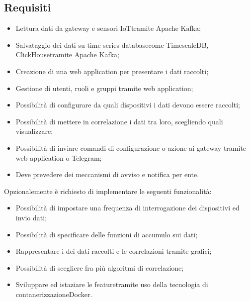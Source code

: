 \subsection{Requisiti}
\begin{itemize}
	\item Lettura dati da gateway e sensori IoT\glosp tramite Apache Kafka\glo;
	\item Salvataggio dei dati su time series database\glosp come TimescaleDB\glo, ClickHouse\glosp tramite Apache Kafka\glo;
	\item Creazione di una web application per presentare i dati raccolti;
	\item Gestione di utenti, ruoli e gruppi tramite web application;
	\item Possibilità di configurare da quali dispositivi i dati devono essere raccolti;
	\item Possibilità di mettere in correlazione i dati tra loro, scegliendo quali visualizzare;
	\item Possibilità di inviare comandi di configurazione o azione ai gateway tramite web application o Telegram\glo;
	\item Deve prevedere dei meccanismi di avviso e notifica per ente.
\end{itemize}
Opzionalemente è richiesto di implementare le seguenti funzionalità:
\begin{itemize}
	\item Possibilità di impostare una frequenza di interrogazione dei dispositivi ed invio dati;
	\item Possibilità di specificare delle funzioni di accumulo sui dati;
	\item Rappresentare i dei dati raccolti e le correlazioni tramite grafici;
	\item Possibilità di scegliere fra più algoritmi di correlazione;
	\item Sviluppare ed istaziare le feature\glosp tramite uso della tecnologia di contanerizzazione\glosp Docker\glo.
\end{itemize}

